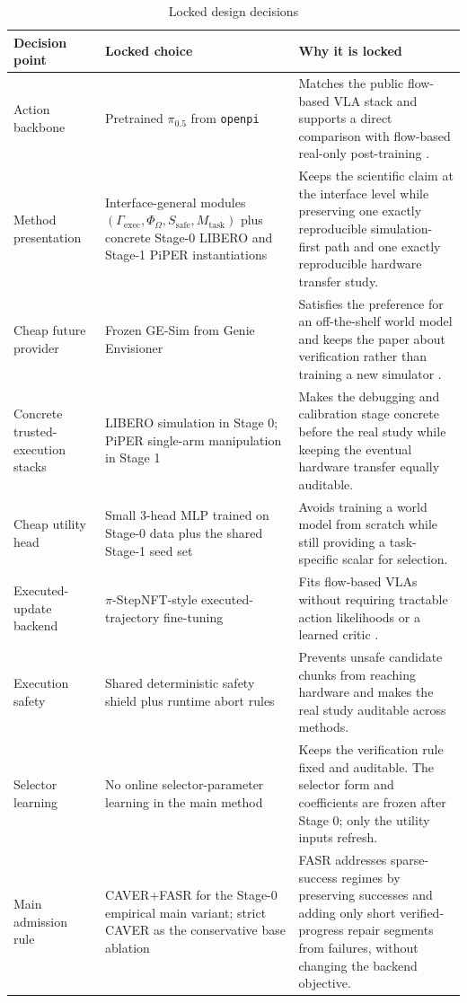 \documentclass[10pt]{article}
\theoremstyle{plain}
\theoremstyle{definition}
\theoremstyle{remark}
\begin{document}
\begin{table}[H]
\centering
\small
\caption*{Locked design decisions}
\begin{tabularx}{\linewidth}{@{}p{3.4cm}p{3.6cm}X@{}}
\toprule
Decision point & Locked choice & Why it is locked \\
\midrule
Action backbone & Pretrained $\pi_{0.5}$ from \texttt{openpi} & Matches the public flow-based VLA stack and supports a direct comparison with flow-based real-only post-training \citep{pi052025,openpi2026repo}. \\
Method presentation & Interface-general modules $(\Gamma_{\mathrm{exec}},\Phi_{\Omega},S_{\mathrm{safe}},M_{\mathrm{task}})$ plus concrete Stage-0 LIBERO and Stage-1 PiPER instantiations & Keeps the scientific claim at the interface level while preserving one exactly reproducible simulation-first path and one exactly reproducible hardware transfer study. \\
Cheap future provider & Frozen GE-Sim from Genie Envisioner & Satisfies the preference for an off-the-shelf world model and keeps the paper about verification rather than training a new simulator \citep{liao2025genie,genierepo2026}. \\
Concrete trusted-execution stacks & LIBERO simulation in Stage 0; PiPER single-arm manipulation in Stage 1 & Makes the debugging and calibration stage concrete before the real study while keeping the eventual hardware transfer equally auditable. \\
Cheap utility head & Small 3-head MLP trained on Stage-0 data plus the shared Stage-1 seed set & Avoids training a world model from scratch while still providing a task-specific scalar for selection. \\
Executed-update backend & $\pi$-StepNFT-style executed-trajectory fine-tuning & Fits flow-based VLAs without requiring tractable action likelihoods or a learned critic \citep{wang2026pistepnft,pistepnftrepo2026}. \\
Execution safety & Shared deterministic safety shield plus runtime abort rules & Prevents unsafe candidate chunks from reaching hardware and makes the real study auditable across methods. \\
Selector learning & No online selector-parameter learning in the main method & Keeps the verification rule fixed and auditable. The selector form and coefficients are frozen after Stage 0; only the utility inputs refresh. \\
Main admission rule & CAVER+FASR for the Stage-0 empirical main variant; strict CAVER as the conservative base ablation & FASR addresses sparse-success regimes by preserving successes and adding only short verified-progress repair segments from failures, without changing the backend objective. \\

\end{tabularx}
\end{table}
\end{document}
